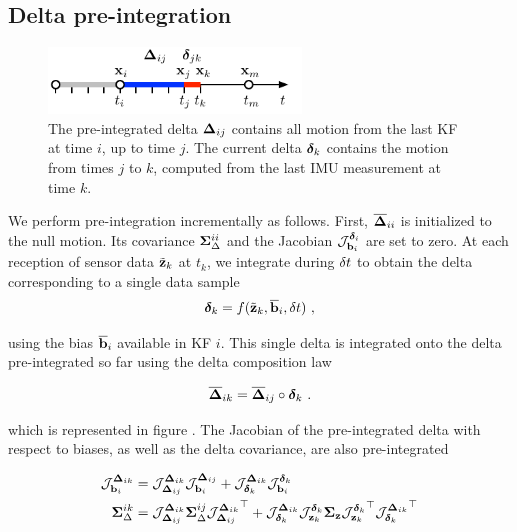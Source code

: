 \subsection{Delta pre-integration}

\begin{figure}[tb]
    \centering
    \includegraphics[width=0.6\textwidth]{figures/delta_time}
    \caption{
    The pre-integrated delta ${\bm \Delta}_{ij}$ contains all motion from the last KF at time $i$, up to time $j$. 
    The current delta ${\bm \delta}_k$ contains the motion from times $j$ to $k$, computed from the last IMU measurement at time $k$.}
    \label{fig:delta_time}
\end{figure}

We perform pre-integration incrementally as follows. 
First, $\overline{{\bm \Delta}}_{ii}$ is initialized to the null motion. 
Its covariance ${\bm \Sigma}_\Delta^{ii}$ and the Jacobian ${\mathcal{J}^{\bm\delta_i}_{{\bf b}_i}}$ are set to zero. 
At each reception of sensor data $\tilde{{\bf z}}_k$ at $t_k$, we integrate during $\delta t$ to obtain the delta corresponding to a single data sample
%
\begin{align}
\bm\delta_k = f(\tilde{{\bf z}}_k, \overline{{\bf b}}_i, \delta t)~, 
\label{eq:data2delta}
\end{align}

using the bias $\overline{{\bf b}}_i$ available in KF $i$. 
This single delta is integrated onto the delta pre-integrated so far using the delta composition law

\begin{align}
\overline{{\bm \Delta}}_{ik} = \overline{{\bm \Delta}}_{ij} \circ \bm\delta_k~. 
\label{eq:deltaPlusDelta}
\end{align}

which is represented in figure .
The Jacobian of the pre-integrated delta with respect to biases, as well as the delta covariance, are also pre-integrated

\begin{align}
    {\mathcal{J}^{{\bm \Delta}_{ik}}_{{\bf b}_i}} &= {\mathcal{J}^{{\bm \Delta}_{ik}}_{{\bm \Delta}_{ij}}}{\mathcal{J}^{{\bm \Delta}_{ij}}_{{\bf b}_i}} 
+ {\mathcal{J}^{{\bm \Delta}_{ik}}_{\bm\delta_k}}{\mathcal{J}^{\bm\delta_k}_{{\bf b}_i}} \\
    {\bm \Sigma}_\Delta^{ik} &= {\mathcal{J}^{{\bm \Delta}_{ik}}_{{\bm \Delta}_{ij}}}{\bm \Sigma}_\Delta^{ij}{\mathcal{J}^{{\bm \Delta}_{ik}}_{{\bm \Delta}_{ij}}}^{\top} 
+ {\mathcal{J}^{{\bm \Delta}_{ik}}_{\bm\delta_k}}{\mathcal{J}^{\bm\delta_k}_{{\bf z}_k}}{\bm \Sigma}_{\bf z}{\mathcal{J}^{\bm\delta_k}_{{\bf z}_k}}^{\top}{\mathcal{J}^{{\bm \Delta}_{ik}}_{\bm\delta_k}}^{\top}
\end{align}

